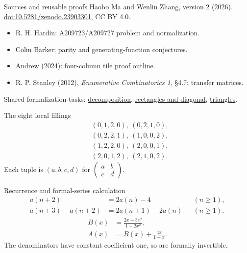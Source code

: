 \documentclass{beamer}
\begin{document}
\begin{frame}{Sources and reusable proofs}
\small
Haobo Ma and Wenlin Zhang, version 2 (2026).\\
\href{https://doi.org/10.5281/zenodo.23903301}{doi:10.5281/zenodo.23903301}, CC BY 4.0.
\begin{itemize}
\item R. H. Hardin: A209723/A209727 problem and normalization.
\item Colin Barker: parity and generating-function conjectures.
\item Andrew (2024): four-column tile proof outline.
\item R. P. Stanley (2012), \emph{Enumerative Combinatorics 1}, §4.7: transfer matrices.
\end{itemize}
Shared formalization tasks: \href{https://github.com/the-omega-institute/trureturing-requests/issues/222}{decomposition}, \href{https://github.com/the-omega-institute/trureturing-requests/issues/223}{rectangles and diagonal}, \href{https://github.com/the-omega-institute/trureturing-requests/issues/224}{triangles}.
\end{frame}
\appendix
\begin{frame}{The eight local fillings}
\[
\begin{aligned}
&(0,1,2,0),\ (0,2,1,0),\\
&(0,2,2,1),\ (1,0,0,2),\\
&(1,2,2,0),\ (2,0,0,1),\\
&(2,0,1,2),\ (2,1,0,2).
\end{aligned}
\]
Each tuple is $(a,b,c,d)$ for $\left(\begin{smallmatrix}a&b\\c&d\end{smallmatrix}\right)$.
\end{frame}
\begin{frame}{Recurrence and formal-series calculation}
\[
\begin{aligned}
a(n+2)&=2a(n)-4 &&(n\geq1),\\
a(n+3)-a(n+2)&=2a(n+1)-2a(n) &&(n\geq1).
\end{aligned}
\]
\[
\begin{aligned}
B(x)&=\frac{2x+3x^2}{1-2x^2},\\
A(x)&=B(x)+\frac{4x}{1-x}.
\end{aligned}
\]
The denominators have constant coefficient one, so are formally invertible.
\end{frame}
\FormalVerification
\end{document}
